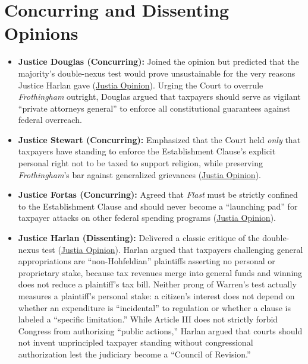 \documentclass[12pt]{article}
\begin{document}
\section{Concurring and Dissenting Opinions}
\begin{itemize}
  \item \textbf{Justice Douglas (Concurring):} Joined the opinion but predicted that the majority's double-nexus test would prove unsustainable for the very reasons Justice Harlan gave (\href{https://supreme.justia.com/cases/federal/us/392/83/}{Justia Opinion}). Urging the Court to overrule \textit{Frothingham} outright, Douglas argued that taxpayers should serve as vigilant ``private attorneys general'' to enforce all constitutional guarantees against federal overreach.
  \item \textbf{Justice Stewart (Concurring):} Emphasized that the Court held \textit{only} that taxpayers have standing to enforce the Establishment Clause's explicit personal right not to be taxed to support religion, while preserving \textit{Frothingham}'s bar against generalized grievances (\href{https://supreme.justia.com/cases/federal/us/392/83/}{Justia Opinion}).
  \item \textbf{Justice Fortas (Concurring):} Agreed that \textit{Flast} must be strictly confined to the Establishment Clause and should never become a ``launching pad'' for taxpayer attacks on other federal spending programs (\href{https://supreme.justia.com/cases/federal/us/392/83/}{Justia Opinion}).
  \item \textbf{Justice Harlan (Dissenting):} Delivered a classic critique of the double-nexus test (\href{https://supreme.justia.com/cases/federal/us/392/83/}{Justia Opinion}). Harlan argued that taxpayers challenging general appropriations are ``non-Hohfeldian'' plaintiffs asserting no personal or proprietary stake, because tax revenues merge into general funds and winning does not reduce a plaintiff's tax bill. Neither prong of Warren's test actually measures a plaintiff's personal stake: a citizen's interest does not depend on whether an expenditure is ``incidental'' to regulation or whether a clause is labeled a ``specific limitation.'' While Article III does not strictly forbid Congress from authorizing ``public actions,'' Harlan argued that courts should not invent unprincipled taxpayer standing without congressional authorization lest the judiciary become a ``Council of Revision.''
\end{itemize}
\end{document}
